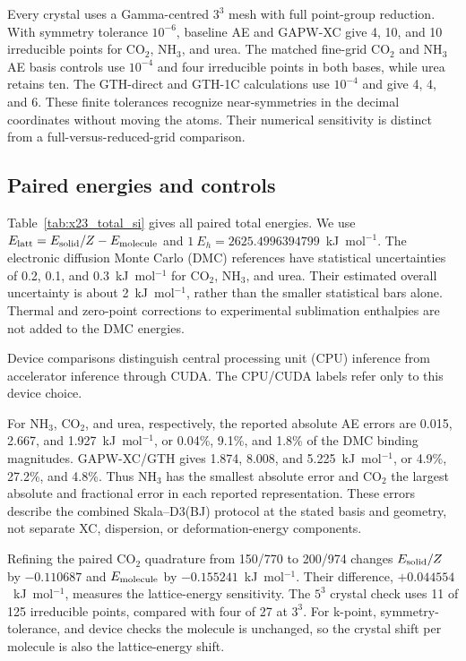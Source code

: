 Every crystal uses a Gamma-centred $3^3$ mesh with full point-group reduction. With symmetry tolerance $10^{-6}$, baseline AE and GAPW-XC give 4, 10, and 10 irreducible points for CO$_2$, NH$_3$, and urea. The matched fine-grid CO$_2$ and NH$_3$ AE basis controls use $10^{-4}$ and four irreducible points in both bases, while urea retains ten. The GTH-direct and GTH-1C calculations use $10^{-4}$ and give 4, 4, and 6. These finite tolerances recognize near-symmetries in the decimal coordinates without moving the atoms. Their numerical sensitivity is distinct from a full-versus-reduced-grid comparison.

\subsection{Paired energies and controls}
\label{sec:crystal-controls}

Table~\ref{tab:x23_total_si} gives all paired total energies. We use $E_{\rm latt}=E_{\rm solid}/Z-E_{\rm molecule}$ and $1~E_h=2625.4996394799$~kJ~mol$^{-1}$. The electronic diffusion Monte Carlo (DMC) references have statistical uncertainties of 0.2, 0.1, and 0.3~kJ~mol$^{-1}$ for CO$_2$, NH$_3$, and urea. Their estimated overall uncertainty is about 2~kJ~mol$^{-1}$, rather than the smaller statistical bars alone.\cite{DellaPia2024X23} Thermal and zero-point corrections to experimental sublimation enthalpies are not added to the DMC energies.

Device comparisons distinguish central processing unit (CPU) inference from accelerator inference through CUDA. The CPU/CUDA labels refer only to this device choice.



For NH$_3$, CO$_2$, and urea, respectively, the reported absolute AE errors are 0.015, 2.667, and 1.927~kJ~mol$^{-1}$, or 0.04\%, 9.1\%, and 1.8\% of the DMC binding magnitudes. GAPW-XC/GTH gives 1.874, 8.008, and 5.225~kJ~mol$^{-1}$, or 4.9\%, 27.2\%, and 4.8\%. Thus NH$_3$ has the smallest absolute error and CO$_2$ the largest absolute and fractional error in each reported representation. These errors describe the combined Skala--D3(BJ) protocol at the stated basis and geometry, not separate XC, dispersion, or deformation-energy components.

Refining the paired CO$_2$ quadrature from 150/770 to 200/974 changes $E_{\rm solid}/Z$ by $-0.110687$ and $E_{\rm molecule}$ by $-0.155241$~kJ~mol$^{-1}$. Their difference, $+0.044554$~kJ~mol$^{-1}$, measures the lattice-energy sensitivity. The $5^3$ crystal check uses 11 of 125 irreducible points, compared with four of 27 at $3^3$. For k-point, symmetry-tolerance, and device checks the molecule is unchanged, so the crystal shift per molecule is also the lattice-energy shift.

